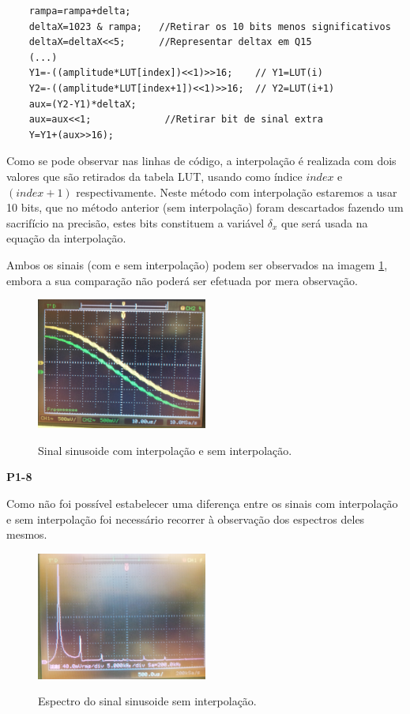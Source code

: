 \documentclass[11pt]{article}
\begin{document}
\begin{lstlisting}
	rampa=rampa+delta;
	deltaX=1023 & rampa;   //Retirar os 10 bits menos significativos
	deltaX=deltaX<<5;      //Representar deltax em Q15
	(...)
	Y1=-((amplitude*LUT[index])<<1)>>16;	// Y1=LUT(i)
	Y2=-((amplitude*LUT[index+1])<<1)>>16;	// Y2=LUT(i+1)
	aux=(Y2-Y1)*deltaX;
	aux=aux<<1;				//Retirar bit de sinal extra
	Y=Y1+(aux>>16);
\end{lstlisting}

Como se pode observar nas linhas de código, a interpolação é realizada com dois valores que são retirados da tabela LUT, usando como índice $\textit{index}$ \hspace{0,1 mm} e $(\textit{index}+1)$ respectivamente. Neste método com interpolação estaremos a usar 10 bits, que no método anterior (sem interpolação) foram descartados fazendo um sacrifício na precisão,  estes bits constituem a variável $ \delta_{x} $ que será usada na equação da interpolação.

Ambos os sinais (com e sem interpolação) podem ser observados na imagem \ref{fig:interp}, embora a sua comparação não poderá ser efetuada por mera observação.

\begin{figure}[H]
	\centering
	\label{fig:interp}
	\includegraphics[width=0.5\textwidth]{./P1_interp}~\\
	\caption{Sinal sinusoide com interpolação e sem interpolação.}
\end{figure}

\textbf{P1-8}
\label{para:P1-8}

Como não foi possível estabelecer uma diferença entre os sinais com interpolação e sem interpolação foi necessário recorrer à observação dos espectros deles mesmos.

\begin{figure}[H]
	\centering
	\label{fig:espect_s_interp}
	\includegraphics[width=0.5\textwidth]{./P1-8_espect_s_interp}~\\
	\caption{Espectro do sinal sinusoide sem interpolação.}
\end{figure}
\end{document}
